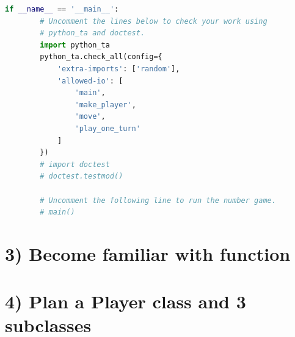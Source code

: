 \documentclass[12pt]{article}
\begin{document}
\begin{lstlisting}[language=Python,caption={lab3.py},captionpos=b]
    if __name__ == '__main__':
        # Uncomment the lines below to check your work using
        # python_ta and doctest.
        import python_ta
        python_ta.check_all(config={
            'extra-imports': ['random'],
            'allowed-io': [
                'main',
                'make_player',
                'move',
                'play_one_turn'
            ]
        })
        # import doctest
        # doctest.testmod()

        # Uncomment the following line to run the number game.
        # main()

\end{lstlisting}

\section*{3) Become familiar with function}

\section*{4) Plan a Player class and 3 subclasses}
\end{document}
